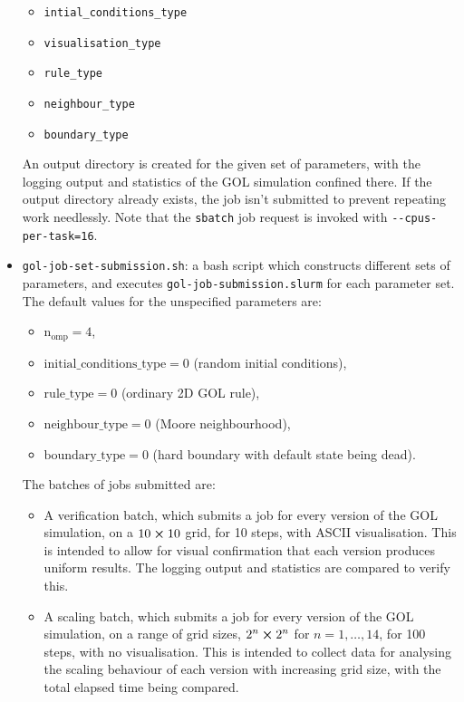 \documentclass[]{article}
\begin{document}
\begin{itemize}
\begin{itemize}
  \item \lstinline{intial_conditions_type}

  \item \lstinline{visualisation_type}

  \item \lstinline{rule_type}

  \item \lstinline{neighbour_type}

  \item \lstinline{boundary_type}
  \end{itemize}
  An output directory is created for the given set of parameters, with the
  logging output and statistics of the GOL simulation confined there.
  If the output directory already exists, the job isn't submitted to prevent
  repeating work needlessly.
  Note that the \lstinline[style=ff]{sbatch} job request is invoked with
  \lstinline{--cpus-per-task=16}.

\item \lstinline[style=ff]{gol-job-set-submission.sh}: a bash script which
  constructs different sets of parameters, and executes
  \lstinline[style=ff]{gol-job-submission.slurm} for each parameter set.
  The default values for the unspecified parameters are:
  \begin{itemize}
  \item $\mathrm{n_{omp}} = 4$,
  \item $\mathrm{initial\_conditions\_type} = 0$ (random initial conditions),
  \item $\mathrm{rule\_type} = 0$ (ordinary 2D GOL rule),
  \item $\mathrm{neighbour\_type} = 0$ (Moore neighbourhood),
  \item $\mathrm{boundary\_type} = 0$ (hard boundary with default state being
    dead).
  \end{itemize}

  The batches of jobs submitted are:
  \begin{itemize}
  \item A verification batch, which submits a job for every version of the GOL
    simulation, on a $10\cross10$ grid, for 10 steps, with ASCII visualisation.
    This is intended to allow for visual confirmation that each version produces
    uniform results.
    The logging output and statistics are compared to verify this.

  \item A scaling batch, which submits a job for every version of the GOL
    simulation, on a range of grid sizes, $2^{n}\cross2^{n}$ for
    $n = 1, \dotsc, 14$, for 100 steps, with no visualisation.
    This is intended to collect data for analysing the scaling behaviour of each
    version with increasing grid size, with the total elapsed time being
    compared.


\end{itemize}
\end{itemize}
\end{document}
